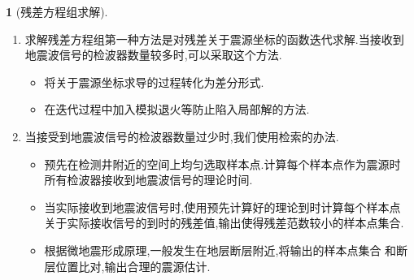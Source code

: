 \documentclass[UTF8]{ctexbeamer}	%
\theoremstyle{plain}
\theoremstyle{definition}
\newtheorem{emt}{}[section]
\theoremstyle{remark}
\numberwithin{equation}{section}
\begin{document}
\begin{frame}
    \begin{emt}[残差方程组求解]
        \begin{enumerate}
            \item 求解残差方程组第一种方法是对残差关于震源坐标的函数迭代求解.当接收到
            地震波信号的检波器数量较多时,可以采取这个方法.
            \begin{itemize}
                \item 将关于震源坐标求导的过程转化为差分形式.
                \item 在迭代过程中加入模拟退火等防止陷入局部解的方法.
            \end{itemize}

            \item 
            当接受到地震波信号的检波器数量过少时,我们使用检索的办法.

            \begin{itemize}
                \item 预先在检测井附近的空间上均匀选取样本点.计算每个样本点作为震源时
                所有检波器接收到地震波信号的理论时间.

                \item 当实际接收到地震波信号时,使用预先计算好的理论到时计算每个样本点
                关于实际接收信号的到时的残差值,输出使得残差范数较小的样本点集合.

                \item 根据微地震形成原理,一般发生在地层断层附近,将输出的样本点集合
                和断层位置比对,输出合理的震源估计.
            \end{itemize}
        \end{enumerate}
    \end{emt}
\end{frame}
\end{document}

